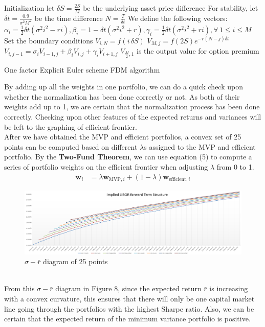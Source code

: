 \begin{algorithm}[H]
 Initialization\;
 let $\delta S = \frac{2S}{M}$ be the underlying asset price difference \;
 For stability, let $\delta t = \frac{0.9}{\sigma^{2}M^{2}}$ be the time difference\;
 $N = \frac{T}{\delta t}$\;
 We define the following vectors:\\
 $\alpha_{i} = \frac{1}{2}\delta t(\sigma^{2}i^{2} - ri), \beta_{i} = 1-\delta t(\sigma^{2}i^{2} + r), \gamma_{i} = \frac{1}{2}\delta t(\sigma^{2}i^{2} + ri), \forall \, 1 \le i \le M$\;
 Set the boundary conditions\;
  {
  $V_{i, N} = f(i\,\delta S)$\;
 }
  {
  $V_{M, j} = f(2S)e^{-r(N-j)\delta t}$\;
 }
  {
   {
   $V_{i, j-1} = \sigma_{i}V_{i-1,j} + \beta_{i}V_{i,j} + \gamma_{i}V_{i+1,j} $\;
  }
 }
 $V_{\frac{M}{2},1}$ is the output value for option premium\;
\caption{One factor Explicit Euler scheme FDM algorithm}
\end{algorithm}
By adding up all the weights in one portfolio, we can do a quick check upon whether the normalization has been done correctly or not. As both of their weights add up to 1, we are certain that the normalization process has been done correctly. Checking upon other features of the expected returns and variances will be left to the graphing of efficient frontier.\\
After we have obtained the MVP and efficient portfolios, a convex set of 25 points can be computed based on different $\lambda$s assigned to the MVP and efficient portfolio. By the \textbf{Two-Fund Theorem}, we can use equation (5) to compute a series of portfolio weights on the efficient frontier when adjusting $\lambda$ from 0 to 1.
\begin{equation}
\begin{split}
\textbf{w}_{i} &= \lambda \textbf{w}_{\text{MVP}, i} + (1 - \lambda) \textbf{w}_{\text{efficient}, i}
\end{split}
\end{equation}
\begin{figure}[h]
	\centering
	\includegraphics[scale=0.5]{biu.PNG}
	\caption{$\sigma-\bar{r}$ diagram of 25 points}
\end{figure}
\\From this $\sigma-\bar{r}$ diagram in Figure 8, since the expected return $\bar{r}$ is increasing with a convex curvature, this ensures that there will only be one capital market line going through the portfolios with the highest Sharpe ratio. Also, we can be certain that the expected return of the minimum variance portfolio is positive.
\newpage

